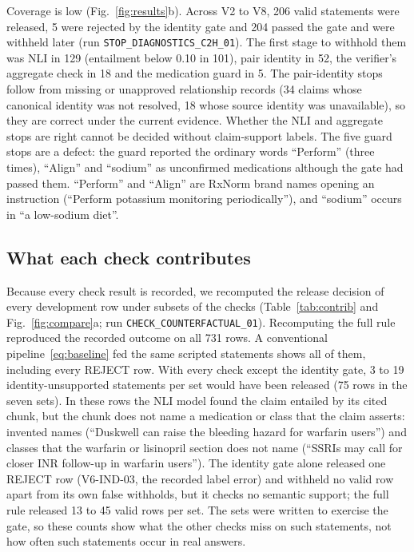 \documentclass[conference]{IEEEtran}
\begin{document}
Coverage is low (Fig.~\ref{fig:results}b). Across V2 to V8, 206 valid statements were released, 5 were rejected by the
identity gate and 204 passed the gate and were withheld later (run \texttt{STOP\_DIAGNOSTICS\_C2H\_01}). The first
stage to withhold them was NLI in 129 (entailment below 0.10 in 101), pair identity in 52, the verifier's aggregate
check in 18 and the medication guard in 5. The pair-identity stops follow from
missing or unapproved relationship records (34 claims whose canonical identity was not resolved, 18 whose source identity
was unavailable), so they are correct under the current evidence. Whether the NLI and aggregate stops are right cannot
be decided without claim-support labels. The five guard stops are a defect: the guard reported the ordinary words
``Perform'' (three times), ``Align'' and ``sodium'' as unconfirmed medications although the gate had passed them.
``Perform'' and ``Align'' are RxNorm brand names opening an instruction (``Perform potassium monitoring
periodically''), and ``sodium'' occurs in ``a low-sodium diet''.



\subsection{What each check contributes}
\label{sec:contrib}

Because every check result is recorded, we recomputed the release decision of every
development row under subsets of the checks (Table~\ref{tab:contrib} and Fig.~\ref{fig:compare}a; run \texttt{CHECK\_COUNTERFACTUAL\_01}).
Recomputing the full rule reproduced the recorded outcome on all 731 rows. A conventional pipeline~\eqref{eq:baseline}
fed the same scripted statements shows all of them, including every REJECT row. With every check except the
identity gate, 3 to 19 identity-unsupported statements per set would have been released (75 rows in the seven sets).
In these rows the NLI model found the claim entailed by its cited chunk, but the chunk does not name a medication or
class that the claim asserts: invented names (``Duskwell can raise the bleeding hazard for warfarin users'') and
classes that the warfarin or lisinopril section does not name (``SSRIs may call for closer INR follow-up in warfarin
users''). The identity gate alone released one REJECT row (V6-IND-03, the recorded label error) and withheld no valid
row apart from its own false withholds, but it checks no semantic support; the full rule released 13 to 45 valid rows
per set. The sets were written to exercise the gate, so these counts show what the other checks miss on such
statements, not how often such statements occur in real answers.
\end{document}
